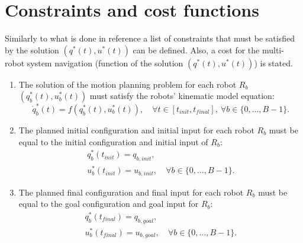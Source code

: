 \section{Constraints and cost functions}

Similarly to what is done in reference \cite{Defoort2009} a list of constraints
that must be satisfied by the solution $(q^{*}(t), u^{*}(t))$ can be defined. Also, a cost for the multi-robot system navigation (function of the solution $(q^{*}(t), u^{*}(t))$) is stated.

\begin{enumerate}

    \item The solution of the motion planning problem
    for each robot $R_b$ $(q^{*}_b(t), u^{*}_b(t))$ must satisfy the
    robots' kinematic model equation:
    \begin{equation}\label{eq:kinematic}
        \dot{q}^{*}_b(t) = f(q^{*}_b(t),u^{*}_b(t)),\quad \forall t \in [t_{init}, t_{final}],\ \forall b \in \{0,\dots,B-1\}.
    \end{equation}
    
    \item The planned initial configuration and initial 
    input for each robot $R_b$ must
    be equal to the initial configuration and initial
    input of $R_b$:
    \begin{align}
        q^{*}_{b}(t_{init}) = q_{b,init},&\\
        u^{*}_{b}(t_{init}) = u_{b,init},& \ \forall b \in \{0,\dots,B-1\}.
    \end{align}

    \item The planned final configuration and final 
    input for each robot $R_b$ must
    be equal to the goal configuration and goal
    input for $R_b$:
    \begin{align}
        q^{*}_{b}(t_{final}) = q_{b,goal},&\\
        u^{*}_{b}(t_{final}) = u_{b,goal},& \ \forall b \in \{0,\dots,B-1\}.
    \end{align}


\end{enumerate}
